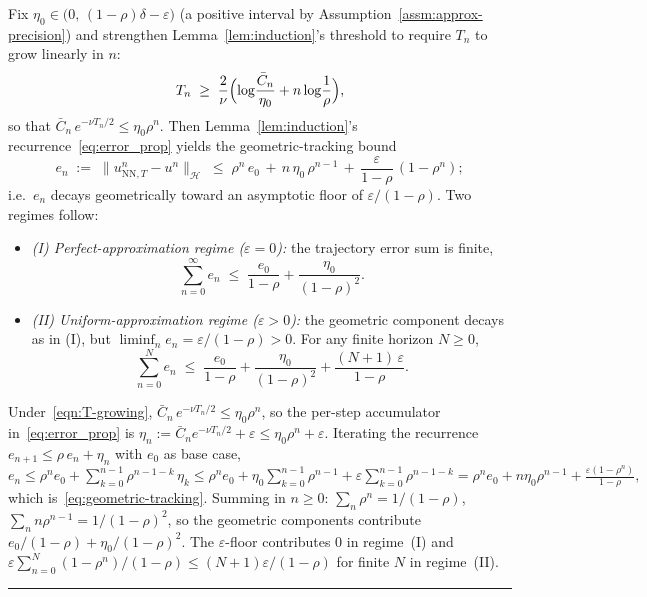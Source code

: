 \documentclass[twoside,11pt]{article}
\newcommand{\BlackBoxProof}{\rule{1.5ex}{1.5ex}}
\renewenvironment{proof}{\par\noindent{\bf Proof\ }}{\hfill\BlackBoxProof\par\medskip}
\newcommand{\NN}{\mathrm{NN}}
\newcommand{\calH}{\mathcal{H}}
\begin{document}
\begin{corollary}\label{cor:geometric-tracking}
Fix $\eta_0\in\bigl(0,\,(1-\rho)\delta-\varepsilon\bigr)$ (a positive interval by Assumption~\ref{assm:approx-precision}) and strengthen Lemma~\ref{lem:induction}'s threshold to require $T_n$ to grow linearly in $n$:
\begin{equation}\label{eqn:T-growing}
T_n \;\ge\; \frac{2}{\nu}\Bigl(\log\!\frac{\bar C_n}{\eta_0}+n\log\!\frac{1}{\rho}\Bigr),
\end{equation}
so that $\bar C_n\,e^{-\nu T_n/2}\le\eta_0\rho^n$. Then Lemma~\ref{lem:induction}'s recurrence~\eqref{eq:error_prop} yields the geometric-tracking bound
\begin{equation}\label{eq:geometric-tracking}
e_n \;:=\;\|u^n_{\NN,T}-u^n\|_\calH \;\le\; \rho^n\,e_0 \,+\, n\,\eta_0\,\rho^{n-1} \,+\, \frac{\varepsilon}{1-\rho}\,(1-\rho^n);
\end{equation}
i.e.\ $e_n$ decays geometrically toward an asymptotic floor of $\varepsilon/(1-\rho)$. Two regimes follow:
\begin{itemize}[leftmargin=*,nosep]
\item \emph{(I) Perfect-approximation regime ($\varepsilon=0$):} the trajectory error sum is finite,
\begin{equation}\label{eq:sum-e-bound}
\sum_{n=0}^{\infty} e_n \;\le\; \frac{e_0}{1-\rho}+\frac{\eta_0}{(1-\rho)^{2}}.
\end{equation}
\item \emph{(II) Uniform-approximation regime ($\varepsilon>0$):} the geometric component decays as in (I), but $\liminf_n e_n=\varepsilon/(1-\rho)>0$. For any finite horizon $N\ge 0$,
\begin{equation}\label{eq:sum-e-partial}
\sum_{n=0}^{N} e_n \;\le\; \frac{e_0}{1-\rho}+\frac{\eta_0}{(1-\rho)^{2}}+\frac{(N+1)\,\varepsilon}{1-\rho}.
\end{equation}
\end{itemize}
\end{corollary}

\begin{proof}
Under~\eqref{eqn:T-growing}, $\bar C_n\,e^{-\nu T_n/2}\le\eta_0\rho^n$, so the per-step accumulator in~\eqref{eq:error_prop} is $\eta_n:=\bar C_n e^{-\nu T_n/2}+\varepsilon\le\eta_0\rho^n+\varepsilon$. Iterating the recurrence $e_{n+1}\le\rho\,e_n+\eta_n$ with $e_0$ as base case,
\(
e_n \le \rho^n e_0 + \sum_{k=0}^{n-1}\rho^{n-1-k}\,\eta_k
\le \rho^n e_0 + \eta_0\sum_{k=0}^{n-1}\rho^{n-1} + \varepsilon\sum_{k=0}^{n-1}\rho^{n-1-k}
= \rho^n e_0 + n\eta_0\rho^{n-1} + \frac{\varepsilon(1-\rho^n)}{1-\rho},
\)
which is~\eqref{eq:geometric-tracking}.
Summing in $n\ge 0$: $\sum_n\rho^n=1/(1-\rho)$, $\sum_n n\rho^{n-1}=1/(1-\rho)^2$, so the geometric components contribute $e_0/(1-\rho)+\eta_0/(1-\rho)^2$. The $\varepsilon$-floor contributes $0$ in regime~(I) and $\varepsilon\sum_{n=0}^N (1-\rho^n)/(1-\rho)\le(N+1)\varepsilon/(1-\rho)$ for finite $N$ in regime~(II).
\end{proof}
\end{document}
